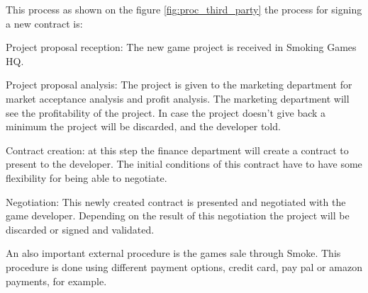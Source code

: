 This process as shown on the figure \ref{fig:proc_third_party} the process for signing a new contract is:

\begin{description}
\item{Project proposal reception: }The new game project is received in Smoking Games HQ.
\item{Project proposal analysis: }The project is given to the marketing department for market acceptance analysis and profit analysis. The marketing department will see the profitability of the project. In case the project doesn't give back a minimum the project will be discarded, and the developer told.
\item{Contract creation: }at this step the finance department will create a contract to present to the developer. The initial conditions of this contract have to have some flexibility for being able to negotiate. 
\item{Negotiation: }This newly created contract is presented and negotiated with the game developer. Depending on the result of this negotiation the project will be discarded or signed and validated.
\end{description}



An also important external procedure is the games sale through Smoke. This procedure is done using different payment options, credit card, pay pal or amazon payments, for example.